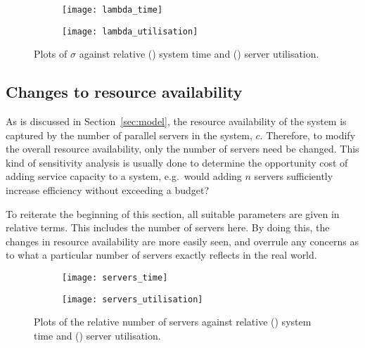 \begin{figure}
    \centering
    \begin{subfigure}{.5\imgwidth}
        \texttt{[image: lambda\_time]}
        \caption{}\label{fig:lambda_time}
    \end{subfigure}\hfill%
    \begin{subfigure}{.5\imgwidth}
        \texttt{[image: lambda\_utilisation]}
        \caption{}\label{fig:lambda_utilisation}
    \end{subfigure}
    \caption{%
        Plots of \(\sigma\) against relative () system
        time and () server utilisation.
    }\label{fig:lambda}
\end{figure}


\subsection{Changes to resource availability}\label{subsec:resources}

As is discussed in Section~\ref{sec:model}, the resource availability of the
system is captured by the number of parallel servers in the system, \(c\).
Therefore, to modify the overall resource availability, only the number of
servers need be changed. This kind of sensitivity analysis is usually done to
determine the opportunity cost of adding service capacity to a system, e.g.\
would adding \(n\) servers sufficiently increase efficiency without exceeding
a budget?

To reiterate the beginning of this section, all suitable parameters are given in
relative terms. This includes the number of servers here. By doing this, the
changes in resource availability are more easily seen, and overrule any concerns
as to what a particular number of servers exactly reflects in the real world.

\begin{figure}
    \centering
    \begin{subfigure}{.5\imgwidth}
        \texttt{[image: servers\_time]}
        \caption{}\label{fig:servers_time}
    \end{subfigure}\hfill%
    \begin{subfigure}{.5\imgwidth}
        \texttt{[image: servers\_utilisation]}
        \caption{}\label{fig:servers_utilisation}
    \end{subfigure}
    \caption{%
        Plots of the relative number of servers against relative
        (\subref{fig:servers_time}) system time and
        () server utilisation.
    }
\end{figure}


